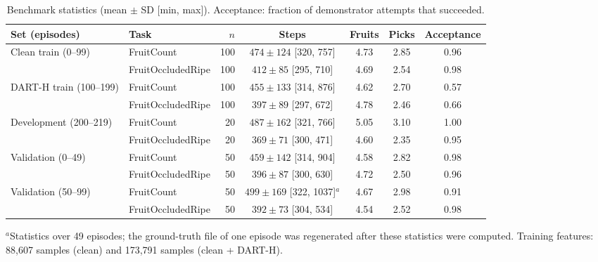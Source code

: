 \begin{table}[t]
\centering
\caption{Benchmark statistics (mean $\pm$ SD [min, max]). Acceptance: fraction of demonstrator attempts that succeeded.}
\label{tab:dataset}
\small
\begin{adjustbox}{max width=\textwidth}\begin{tabular}{llrcccc}
\toprule
Set (episodes) & Task & $n$ & Steps & Fruits & Picks & Acceptance\\
\midrule
Clean train (0--99) & FruitCount & 100 & $474\pm124$ [320, 757] & 4.73 & 2.85 & 0.96\\
 & FruitOccludedRipe & 100 & $412\pm85$ [295, 710] & 4.69 & 2.54 & 0.98\\
DART-H train (100--199) & FruitCount & 100 & $455\pm133$ [314, 876] & 4.62 & 2.70 & 0.57\\
 & FruitOccludedRipe & 100 & $397\pm89$ [297, 672] & 4.78 & 2.46 & 0.66\\
Development (200--219) & FruitCount & 20 & $487\pm162$ [321, 766] & 5.05 & 3.10 & 1.00\\
 & FruitOccludedRipe & 20 & $369\pm71$ [300, 471] & 4.60 & 2.35 & 0.95\\
Validation (0--49) & FruitCount & 50 & $459\pm142$ [314, 904] & 4.58 & 2.82 & 0.98\\
 & FruitOccludedRipe & 50 & $396\pm87$ [300, 630] & 4.72 & 2.50 & 0.96\\
Validation (50--99) & FruitCount & 50 & $499\pm169$ [322, 1037]$^{a}$ & 4.67 & 2.98 & 0.91\\
 & FruitOccludedRipe & 50 & $392\pm73$ [304, 534] & 4.54 & 2.52 & 0.98\\
\bottomrule
\end{tabular}\end{adjustbox}

\footnotesize $^{a}$Statistics over 49 episodes; the ground-truth file of one episode was regenerated after these statistics were computed. Training features: 88,607 samples (clean) and 173,791 samples (clean + DART-H).
\end{table}

